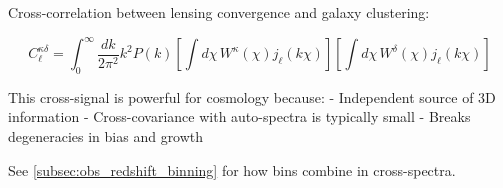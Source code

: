 Cross-correlation between lensing convergence and galaxy clustering:

\begin{equation}
C_\ell^{\kappa\delta} = \int_0^\infty \frac{dk}{2\pi^2} k^2 P(k) \left[\int d\chi \, W^\kappa(\chi) j_\ell(k\chi)\right] \left[\int d\chi \, W^\delta(\chi) j_\ell(k\chi)\right]
\end{equation}

This cross-signal is powerful for cosmology because:
- Independent source of 3D information
- Cross-covariance with auto-spectra is typically small
- Breaks degeneracies in bias and growth


See \cref{subsec:obs_redshift_binning} for how bins combine in cross-spectra.
